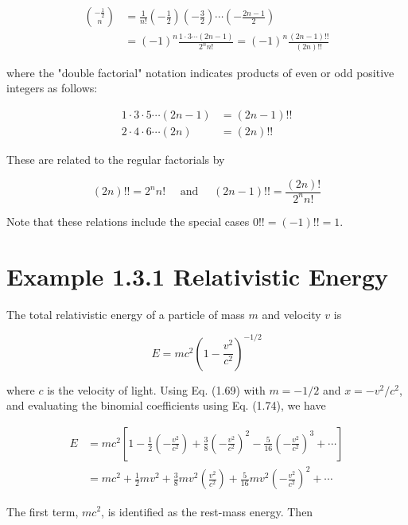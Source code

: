 \documentclass[10pt]{article}
\begin{document}
\begin{align*}
\binom{-\frac{1}{2}}{n} & =\frac{1}{n!}\left(-\frac{1}{2}\right)\left(-\frac{3}{2}\right) \cdots\left(-\frac{2 n-1}{2}\right) \\
& =(-1)^{n} \frac{1 \cdot 3 \cdots(2 n-1)}{2^{n} n!}=(-1)^{n} \frac{(2 n-1)!!}{(2 n)!!} \tag{1.74}
\end{align*}


where the "double factorial" notation indicates products of even or odd positive integers as follows:


\begin{align*}
1 \cdot 3 \cdot 5 \cdots(2 n-1) & =(2 n-1)!! \\
2 \cdot 4 \cdot 6 \cdots(2 n) & =(2 n)!! \tag{1.75}
\end{align*}


These are related to the regular factorials by


\begin{equation*}
(2 n)!!=2^{n} n!\quad \text { and } \quad(2 n-1)!!=\frac{(2 n)!}{2^{n} n!} \tag{1.76}
\end{equation*}


Note that these relations include the special cases $0!!=(-1)!!=1$.

\section*{Example 1.3.1 Relativistic Energy}
The total relativistic energy of a particle of mass $m$ and velocity $v$ is


\begin{equation*}
E=m c^{2}\left(1-\frac{v^{2}}{c^{2}}\right)^{-1 / 2} \tag{1.77}
\end{equation*}


where $c$ is the velocity of light. Using Eq. (1.69) with $m=-1 / 2$ and $x=-v^{2} / c^{2}$, and evaluating the binomial coefficients using Eq. (1.74), we have


\begin{align*}
E & =m c^{2}\left[1-\frac{1}{2}\left(-\frac{v^{2}}{c^{2}}\right)+\frac{3}{8}\left(-\frac{v^{2}}{c^{2}}\right)^{2}-\frac{5}{16}\left(-\frac{v^{2}}{c^{2}}\right)^{3}+\cdots\right] \\
& =m c^{2}+\frac{1}{2} m v^{2}+\frac{3}{8} m v^{2}\left(\frac{v^{2}}{c^{2}}\right)+\frac{5}{16} m v^{2}\left(-\frac{v^{2}}{c^{2}}\right)^{2}+\cdots \tag{1.78}
\end{align*}


The first term, $m c^{2}$, is identified as the rest-mass energy. Then
\end{document}
